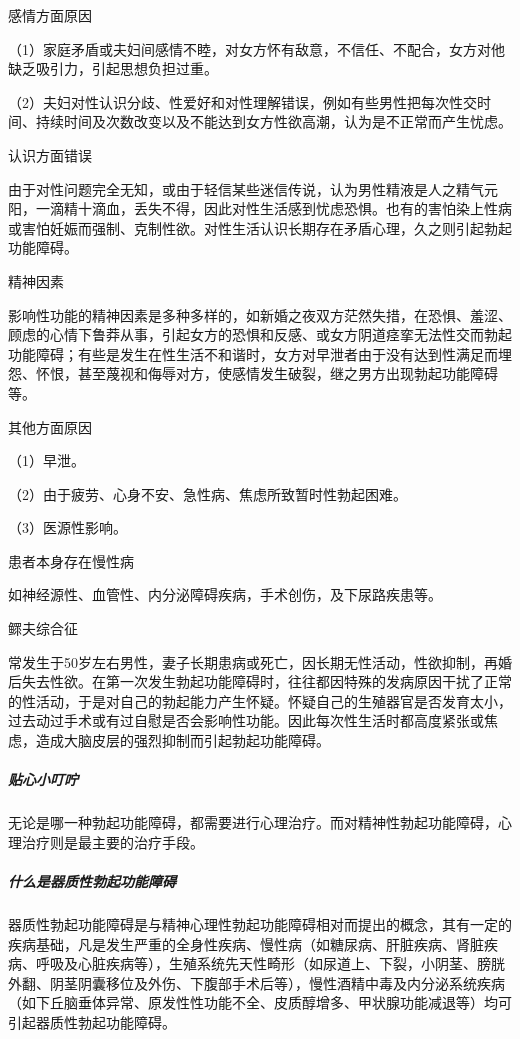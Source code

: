 感情方面原因

（1）家庭矛盾或夫妇间感情不睦，对女方怀有敌意，不信任、不配合，女方对他缺乏吸引力，引起思想负担过重。

（2）夫妇对性认识分歧、性爱好和对性理解错误，例如有些男性把每次性交时间、持续时间及次数改变以及不能达到女方性欲高潮，认为是不正常而产生忧虑。

认识方面错误

由于对性问题完全无知，或由于轻信某些迷信传说，认为男性精液是人之精气元阳，一滴精十滴血，丢失不得，因此对性生活感到忧虑恐惧。也有的害怕染上性病或害怕妊娠而强制、克制性欲。对性生活认识长期存在矛盾心理，久之则引起勃起功能障碍。

精神因素

影响性功能的精神因素是多种多样的，如新婚之夜双方茫然失措，在恐惧、羞涩、顾虑的心情下鲁莽从事，引起女方的恐惧和反感、或女方阴道痉挛无法性交而勃起功能障碍；有些是发生在性生活不和谐时，女方对早泄者由于没有达到性满足而埋怨、怀恨，甚至蔑视和侮辱对方，使感情发生破裂，继之男方出现勃起功能障碍等。

其他方面原因

（1）早泄。

（2）由于疲劳、心身不安、急性病、焦虑所致暂时性勃起困难。

（3）医源性影响。

患者本身存在慢性病

如神经源性、血管性、内分泌障碍疾病，手术创伤，及下尿路疾患等。

鳏夫综合征

常发生于50岁左右男性，妻子长期患病或死亡，因长期无性活动，性欲抑制，再婚后失去性欲。在第一次发生勃起功能障碍时，往往都因特殊的发病原因干扰了正常的性活动，于是对自己的勃起能力产生怀疑。怀疑自己的生殖器官是否发育太小，过去动过手术或有过自慰是否会影响性功能。因此每次性生活时都高度紧张或焦虑，造成大脑皮层的强烈抑制而引起勃起功能障碍。

\subparagraph{贴心小叮咛}

无论是哪一种勃起功能障碍，都需要进行心理治疗。而对精神性勃起功能障碍，心理治疗则是最主要的治疗手段。

\subparagraph{什么是器质性勃起功能障碍}

器质性勃起功能障碍是与精神心理性勃起功能障碍相对而提出的概念，其有一定的疾病基础，凡是发生严重的全身性疾病、慢性病（如糖尿病、肝脏疾病、肾脏疾病、呼吸及心脏疾病等），生殖系统先天性畸形（如尿道上、下裂，小阴茎、膀胱外翻、阴茎阴囊移位及外伤、下腹部手术后等），慢性酒精中毒及内分泌系统疾病（如下丘脑垂体异常、原发性性功能不全、皮质醇增多、甲状腺功能减退等）均可引起器质性勃起功能障碍。


